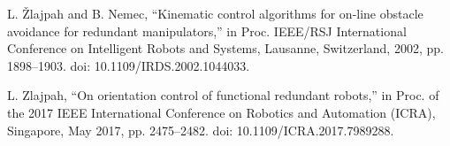 \documentclass[letterpaper, 10 pt, conference]{ieeeconf}  %
\begin{document}
\begin{thebibliography}{99}
 L. Žlajpah and B. Nemec, “Kinematic control algorithms for on-line obstacle avoidance for redundant manipulators,” in Proc. IEEE/RSJ International Conference on Intelligent Robots and Systems, Lausanne, Switzerland, 2002, pp. 1898–1903. doi: 10.1109/IRDS.2002.1044033.

L. Zlajpah, “On orientation control of functional redundant robots,” in Proc. of the 2017 IEEE International Conference on Robotics and Automation (ICRA), Singapore, May 2017, pp. 2475–2482. doi: 10.1109/ICRA.2017.7989288.



\end{thebibliography}
\end{document}
